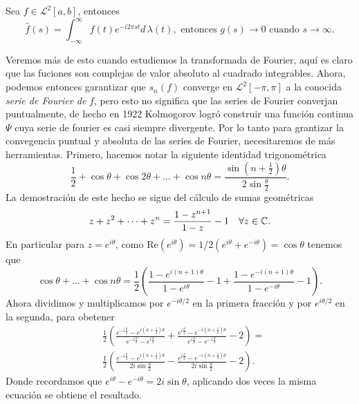 \documentclass[main.tex]{subfiles}
\begin{document}
\begin{lema}
  Sea \(f\in\mathcal{L}^{2}[a,b]\), entonces
  \begin{equation}
    \hat{f}(s)=\int_{-\infty}^{\infty}f(t)e^{-i2\pi st}d\,\lambda(t),\text{ entonces }g(s)\to 0\text{ cuando }s\to\infty.
    \end{equation}
  \end{lema}
  \noindent Veremos m\'as de esto cuando estudiemos la transformada de Fourier, aqu\'i es claro que las fuciones son complejas de valor absoluto al cuadrado integrables.
  Ahora, podemos entonces garantizar que \(s_{n}(f)\) converge en \(\mathcal{L}^{2}[-\pi,\pi]\) a la conocida \emph{serie de Fourier de} \(f\), pero esto no significa que las series de Fourier converjan puntualmente, de hecho en 1922 Kolmogorov logr\'o construir una funci\'on continua \(\Psi\) cuya serie de fourier es casi siempre divergente. %
  Por lo tanto para grantizar la convegencia puntual y absoluta de las series de Fourier, necesitaremos de m\'as herramientas.
  Primero, hacemos notar la siguiente identidad trigonom\'etrica
  \begin{equation}
    \frac{1}{2}+\cos\theta+\cos2\theta+\dots+\cos n\theta=\frac{\sin(n+\frac{1}{2})\theta}{2\sin\frac{\theta}{2}}.
  \end{equation}
  La demostraci\'on de este hecho se sigue del c\'alculo de sumas geom\'etricas
  \[
    z+z^{2}+\dots+z^{n}=\frac{1-z^{n+1}}{1-z}-1\quad\forall z\in\mathbb C .
  \]
  En particular para \(z=e^{i\theta}\), como \(\text{Re}(e^{i\theta})=1/2(e^{i\theta}+e^{-i\theta})=\cos\theta\) tenemos que
  \[
    \cos\theta+\dots+\cos n\theta=\frac{1}{2}\left(\frac{1-e^{i(n+1)\theta}}{1-e^{i\theta}}-1+\frac{1-e^{-i(n+1)\theta}}{1-e^{-i\theta}}-1\right).
  \]
  \noindent Ahora dividimos y multiplicamos por \(e^{-i\theta/2}\) en la primera fracci\'on y por \(e^{i\theta/2}\) en la segunda, para obetener
  \begin{align*}
    &\frac{1}{2}\left(\frac{e^{-i\frac{\theta}{2}}-e^{i(n+\frac{1}{2})\theta}}{ e^{-i\frac{\theta}{2}}-e^{i\frac{\theta}{2}}} + \frac{e^{i\frac{\theta}{2}}-e^{-i(n+\frac{1}{2})\theta}}{ e^{i\frac{\theta}{2}}-e^{-i\frac{\theta}{2}}} -2\right)=\\
    &\frac{1}{2}\left(\frac{e^{-i\frac{\theta}{2}}-e^{i(n+\frac{1}{2})\theta}}{2i\sin\frac{\theta}{2}} - \frac{e^{i\frac{\theta}{2}}-e^{-i(n+\frac{1}{2})\theta}}{2i\sin\frac{\theta}{2}} -2\right).
  \end{align*}
  Donde recordamos que \(e^{i\theta}-e^{-i\theta}=2i\sin\theta\), aplicando dos veces la misma ecuaci\'on se obtiene el resultado.
\end{document}
